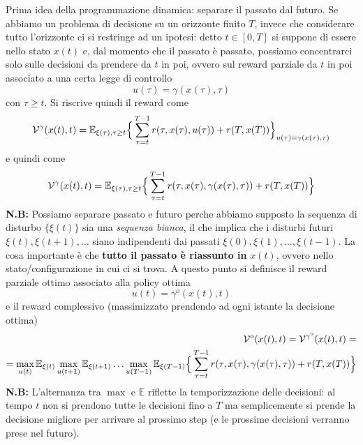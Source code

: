 Prima idea della programmazione dinamica: separare il passato dal futuro. Se abbiamo un problema di decisione su un orizzonte finito $T$, invece che considerare tutto l'orizzonte ci si restringe ad un ipotesi: detto $t \in [0,T]$ si suppone di essere nello stato $x(t)$ e, dal momento che il passato \`e passato, possiamo concentrarci solo sulle decisioni da prendere da $t$ in poi, ovvero sul reward parziale da $t$ in poi associato a una certa legge di controllo
\begin{equation}
u(\tau) = \gamma (x(\tau), \tau)
\end{equation}
con $\tau \geq t$. Si riscrive quindi il reward come
\begin{equation}
\mathcal{V}^{\gamma}(x(t),t) = \mathbb{E}_{\xi(\tau), \tau \geq t} \Big \{ \sum_{\tau=t}^{T-1} r (\tau, x(\tau), u(\tau)) + r(T, x(T)) \Big \}_{u(\tau) =\gamma(x(\tau), \tau)}
\end{equation} e quindi come
\begin{equation}
\mathcal{V}^{\gamma}(x(t),t) = \mathbb{E}_{\xi(\tau), \tau \geq t} \Big \{ \sum_{\tau=t}^{T-1} r (\tau, x(\tau), \gamma(x(\tau), \tau)) + r(T, x(T)) \Big \}
\end{equation}
\textbf{N.B:} Possiamo separare passato e futuro perche abbiamo supposto la sequenza di disturbo $\{ \xi(t) \}$ sia una \textit{sequenza bianca}, il che implica che i disturbi futuri $\xi(t), \xi(t+1), \dots$ siano indipendenti dai passati $\xi(0), \xi(1), \dots, \xi(t-1)$. La cosa importante \`e che \textbf{tutto il passato \`e riassunto in} $x(t)$, ovvero nello stato/configurazione in cui ci si trova.
A questo punto si definisce il reward parziale ottimo associato alla policy ottima
\begin{equation}
u(t) = \gamma^o (x(t), t)
\end{equation} e il reward complessivo (massimizzato prendendo ad ogni istante la decisione ottima)
\begin{align}
\mathcal{V}^o(x(t),t) = \mathcal{V}^{\gamma^o}(x(t), t) = \\
= \max_{u(t)} \mathbb{E}_{\xi(t)} \max_{u(t+1)} \mathbb{E}_{\xi(t+1)} \dots \max_{u(T-1)} \mathbb{E}_{\xi(T-1)} \Big \{ \sum_{\tau=t}^{T-1} r (\tau, x(\tau), \gamma(x(\tau), \tau)) + r(T, x(T)) \Big \}
\end{align} \textbf{N.B:} L'alternanza tra $\max$ e $\mathbb{E}$ riflette la temporizzazione delle decisioni: al tempo $t$ non si prendono tutte le decisioni fino a $T$ ma semplicemente si prende la decisione migliore per arrivare al prossimo step (e le prossime decisioni verranno prese nel futuro).

